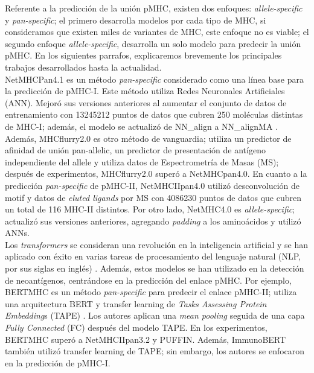 \documentclass[a4paper]{article}
\begin{document}
Referente a la 	predicción de la unión pMHC, existen dos enfoques: \textit{allele-specific} y \textit{pan-specific}; el primero desarrolla modelos por cada tipo de MHC, si consideramos que existen miles de variantes de MHC, este enfoque no es viable; el segundo enfoque \textit{allele-specific}, desarrolla un solo modelo para predecir la unión pMHC. En los siguientes parrafos, explicaremos brevemente los principales trabajos desarrollados hasta la actualidad.\\
	
	NetMHCPan4.1 \citep{reynisson2020netmhcpan} es un método 	\textit{pan-specific} considerado como una línea base para la predicción de pMHC-I. Este método utiliza Redes Neuronales Artificiales (ANN). Mejoró sus versiones anteriores al aumentar el conjunto de datos de entrenamiento con 13245212 puntos de datos que cubren 250 moléculas distintas de MHC-I; además, el modelo se actualizó de NN\_align a NN\_alignMA \citep{alvarez2019nnalign_ma}. Además, MHCflurry2.0 \citep{o2020mhcflurry} es otro método de vanguardia; utiliza un predictor de afinidad de unión pan-allelic, un predictor de presentación de antígeno independiente del allele y utiliza datos de Espectrometría de Masas (MS); después de experimentos, MHCflurry2.0 superó a NetMHCpan4.0. En cuanto a la predicción \textit{pan-specific} de pMHC-II, NetMHCIIpan4.0 \citep{reynisson2020netmhcpan} utilizó desconvolución de motif y datos de \textit{eluted ligands} por MS con 4086230 puntos de datos que cubren un total de 116 MHC-II distintos. Por otro lado, NetMHC4.0 \citep{andreatta2016gapped} es \textit{allele-specific}; actualizó sus versiones anteriores, agregando \textit{padding} a los aminoácidos y utilizó ANNs. \\

Los \textit{transformers} se consideran una revolución en la inteligencia artificial y se han aplicado con éxito en varias tareas de procesamiento del lenguaje natural (NLP, por sus siglas en inglés) \citep{patwardhan2023transformers}. Además, estos modelos se han utilizado en la detección de neoantígenos, centrándose en la predicción del enlace pMHC. Por ejemplo, BERTMHC \citep{cheng2021bertmhc} es un método 	\textit{pan-specific} para predecir el enlace pMHC-II; utiliza una arquitectura BERT y transfer learning de \textit{Tasks Assessing Protein Embedding}s (TAPE) \citep{rao2019evaluating}. Los autores aplican una \textit{mean pooling} seguida de una capa \textit{Fully Connected} (FC) después del modelo TAPE. En los experimentos, BERTMHC superó a NetMHCIIpan3.2 y PUFFIN. Además, ImmunoBERT \citep{gasser2021interpreting} también utilizó transfer learning de TAPE; sin embargo, los autores se enfocaron en la predicción de pMHC-I.\\
\end{document}
